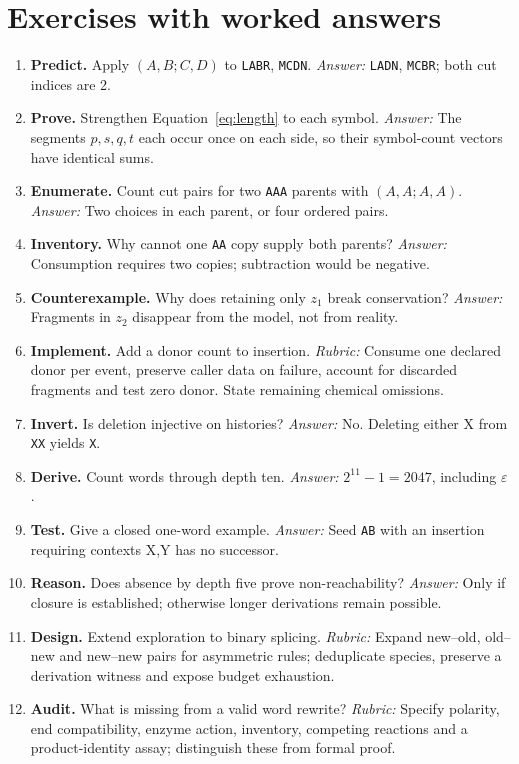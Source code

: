 \section{Exercises with worked answers}
\begin{enumerate}
\item \textbf{Predict.} Apply $(A,B;C,D)$ to \texttt{LABR}, \texttt{MCDN}.
\emph{Answer:} \texttt{LADN}, \texttt{MCBR}; both cut indices are 2.
\item \textbf{Prove.} Strengthen Equation~\ref{eq:length} to each symbol.
\emph{Answer:} The segments $p,s,q,t$ each occur once on each side, so their
symbol-count vectors have identical sums.
\item \textbf{Enumerate.} Count cut pairs for two \texttt{AAA} parents
with $(A,A;A,A)$. \emph{Answer:} Two choices in each parent, or four ordered pairs.
\item \textbf{Inventory.} Why cannot one \texttt{AA} copy supply both parents?
\emph{Answer:} Consumption requires two copies; subtraction would be negative.
\item \textbf{Counterexample.} Why does retaining only $z_1$ break conservation?
\emph{Answer:} Fragments in $z_2$ disappear from the model, not from reality.
\item \textbf{Implement.} Add a donor count to insertion.
\emph{Rubric:} Consume one declared donor per event, preserve caller data on failure,
account for discarded fragments and test zero donor. State remaining chemical omissions.
\item \textbf{Invert.} Is deletion injective on histories?
\emph{Answer:} No. Deleting either X from \texttt{XX} yields \texttt{X}.
\item \textbf{Derive.} Count words through depth ten.
\emph{Answer:} $2^{11}-1=2047$, including $\varepsilon$.
\item \textbf{Test.} Give a closed one-word example.
\emph{Answer:} Seed \texttt{AB} with an insertion requiring contexts X,Y has no successor.
\item \textbf{Reason.} Does absence by depth five prove non-reachability?
\emph{Answer:} Only if closure is established; otherwise longer derivations remain possible.
\item \textbf{Design.} Extend exploration to binary splicing.
\emph{Rubric:} Expand new--old, old--new and new--new pairs for asymmetric rules;
deduplicate species, preserve a derivation witness and expose budget exhaustion.
\item \textbf{Audit.} What is missing from a valid word rewrite?
\emph{Rubric:} Specify polarity, end compatibility, enzyme action, inventory,
competing reactions and a product-identity assay; distinguish these from formal proof.
\end{enumerate}
